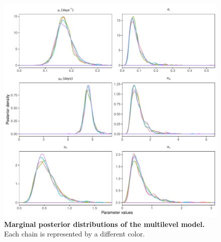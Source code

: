 \documentclass[12pt]{article}
\begin{document}
\begin{figure}[!h]
\includegraphics[width=\textwidth]{posterior_dist.pdf}
\caption{
\textbf{Marginal posterior distributions of the multilevel model.}
Each chain is represented by a different color.
}
\end{figure}
\end{document}
